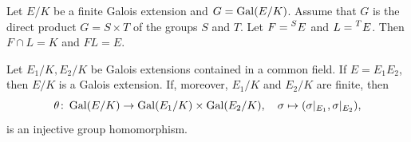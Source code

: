     
    

\begin{exercise}
    Let $E/K$ be a finite Galois extension and $G=\operatorname{Gal}(E/K)$.
    Assume that $G$ is the direct product
    $G=S\times T$
    of the groups $S$ and $T$. Let 
    $F=\prescript{S}{}{E}$ and
    $L=\prescript{T}{}{E}$. Then $F\cap L=K$ and $FL=E$.
\end{exercise}

\begin{proposition}
Let $E_1/K,E_2/K$ be Galois extensions contained in a common field. 
If $E=E_1E_2$, then $E/K$ is a Galois extension. If, moreover, $E_1/K$ and $E_2/K$ are finite,
then 
\[
\theta\colon \operatorname{Gal}(E/K)\to \operatorname{Gal}(E_1/K)\times\operatorname{Gal}(E_2/K),
\quad
\sigma\mapsto(\sigma|_{E_1},\sigma|_{E_2}),
\]
is an injective group homomorphism.
\end{proposition}

